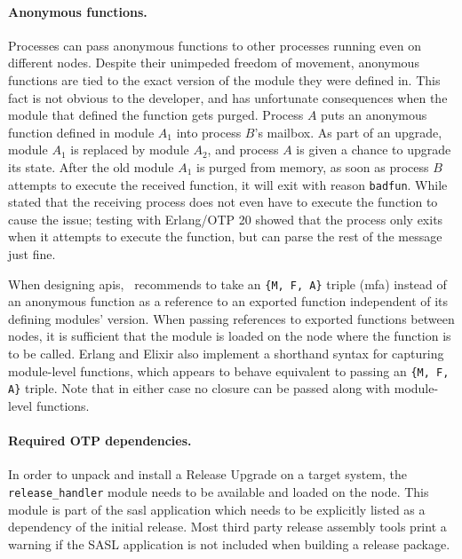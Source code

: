 \paragraph{Anonymous functions.}
Processes can pass anonymous functions to other processes running even on different nodes. Despite their unimpeded freedom of movement, anonymous functions are tied to the exact version of the module they were defined in. This fact is not obvious to the developer, and has unfortunate consequences when the module that defined the function gets purged. Process $A$ puts an anonymous function defined in module $A_1$ into process $B$'s mailbox. As part of an upgrade, module $A_1$ is replaced by module $A_2$, and process $A$ is given a chance to upgrade its state. After the old module $A_1$ is purged from memory, as soon as process $B$ attempts to execute the received function, it will exit with reason \lstinline|badfun|. While~\cite{davis:talk} stated that the receiving process does not even have to execute the function to cause the issue; testing with Erlang/OTP 20 showed that the process only exits when it attempts to execute the function, but can parse the rest of the message just fine.

When designing \acrshort{api}s,~\cite{davis:talk} recommends to take an \lstinline|{M, F, A}| triple (\acrlong{mfa}) instead of an anonymous function as a reference to an exported function independent of its defining modules' version. When passing references to exported functions between nodes, it is sufficient that the module is loaded on the node where the function is to be called. Erlang and Elixir also implement a shorthand syntax for capturing module-level functions, which appears to behave equivalent to passing an \lstinline|{M, F, A}| triple. Note that in either case no closure can be passed along with module-level functions.


\paragraph{Required OTP dependencies.}
In order to unpack and install a Release Upgrade on a target system, the \lstinline|release_handler| module needs to be available and loaded on the node. This module is part of the \acrfull{sasl} application which needs to be explicitly listed as a dependency of the initial release. Most third party release assembly tools print a warning if the SASL application is not included when building a release package.



